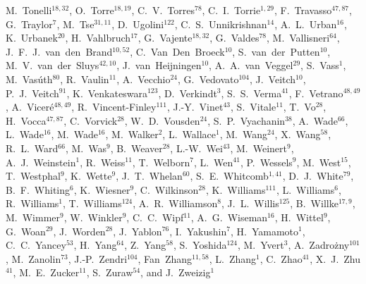 \documentclass[12pt]{iopart}
\begin{document}
{M.~Tonelli$^{18,32}$, 
O.~Torre$^{18,19}$, 
C.~V.~Torres$^{78}$, 
C.~I.~Torrie$^{1,29}$, 
F.~Travasso$^{47,87}$, 
G.~Traylor$^{7}$, 
M.~Tse$^{31,11}$, 
D.~Ugolini$^{122}$, 
C.~S.~Unnikrishnan$^{14}$, 
A.~L.~Urban$^{16}$, 
K.~Urbanek$^{20}$, 
H.~Vahlbruch$^{17}$, 
G.~Vajente$^{18,32}$, 
G.~Valdes$^{78}$, 
M.~Vallisneri$^{64}$, 
J.~F.~J.~van~den~Brand$^{10,52}$, 
C.~Van~Den~Broeck$^{10}$, 
S.~van~der~Putten$^{10}$, 
M.~V.~van~der~Sluys$^{42,10}$, 
J.~van~Heijningen$^{10}$, 
A.~A.~van~Veggel$^{29}$, 
S.~Vass$^{1}$, 
M.~Vas\'uth$^{80}$, 
R.~Vaulin$^{11}$, 
A.~Vecchio$^{24}$, 
G.~Vedovato$^{104}$, 
J.~Veitch$^{10}$, 
P.~J.~Veitch$^{91}$, 
K.~Venkateswara$^{123}$, 
D.~Verkindt$^{3}$, 
S.~S.~Verma$^{41}$, 
F.~Vetrano$^{48,49}$, 
A.~Vicer\'e$^{48,49}$, 
R.~Vincent-Finley$^{111}$, 
J.-Y.~Vinet$^{43}$, 
S.~Vitale$^{11}$, 
T.~Vo$^{28}$, 
H.~Vocca$^{47,87}$, 
C.~Vorvick$^{28}$, 
W.~D.~Vousden$^{24}$, 
S.~P.~Vyachanin$^{38}$, 
A.~Wade$^{66}$, 
L.~Wade$^{16}$, 
M.~Wade$^{16}$, 
M.~Walker$^{2}$, 
L.~Wallace$^{1}$, 
M.~Wang$^{24}$, 
X.~Wang$^{58}$, 
R.~L.~Ward$^{66}$, 
M.~Was$^{9}$, 
B.~Weaver$^{28}$, 
L.-W.~Wei$^{43}$, 
M.~Weinert$^{9}$, 
A.~J.~Weinstein$^{1}$, 
R.~Weiss$^{11}$, 
T.~Welborn$^{7}$, 
L.~Wen$^{41}$, 
P.~Wessels$^{9}$, 
M.~West$^{15}$, 
T.~Westphal$^{9}$, 
K.~Wette$^{9}$, 
J.~T.~Whelan$^{60}$, 
S.~E.~Whitcomb$^{1,41}$, 
D.~J.~White$^{79}$, 
B.~F.~Whiting$^{6}$, 
K.~Wiesner$^{9}$, 
C.~Wilkinson$^{28}$, 
K.~Williams$^{111}$, 
L.~Williams$^{6}$, 
R.~Williams$^{1}$, 
T.~Williams$^{124}$, 
A.~R.~Williamson$^{8}$, 
J.~L.~Willis$^{125}$, 
B.~Willke$^{17,9}$, 
M.~Wimmer$^{9}$, 
W.~Winkler$^{9}$, 
C.~C.~Wipf$^{11}$, 
A.~G.~Wiseman$^{16}$, 
H.~Wittel$^{9}$, 
G.~Woan$^{29}$, 
J.~Worden$^{28}$, 
J.~Yablon$^{76}$, 
I.~Yakushin$^{7}$, 
H.~Yamamoto$^{1}$, 
C.~C.~Yancey$^{53}$, 
H.~Yang$^{64}$, 
Z.~Yang$^{58}$, 
S.~Yoshida$^{124}$, 
M.~Yvert$^{3}$, 
A.~Zadro\.zny$^{101}$, 
M.~Zanolin$^{73}$, 
J.-P.~Zendri$^{104}$, 
Fan~Zhang$^{11,58}$, 
L.~Zhang$^{1}$, 
C.~Zhao$^{41}$, 
X.~J.~Zhu$^{41}$, 
M.~E.~Zucker$^{11}$, 
S.~Zuraw$^{54}$,
and 
J.~Zweizig$^{1}$}

\author{M.~Boyle$^{126}$,
B.~Br\"ugmann$^{127}$,
L.~T.~Buchman$^{64}$,
M.~Campanelli$^{60}$,
T.~Chu$^{57}$,
Z.~B.~Etienne$^{53,40}$,
M.~Hannam$^{8}$,
J.~Healy$^{128,60}$,
I.~Hinder$^{25}$,
L.~E.~Kidder$^{126}$,
P.~Laguna$^{128}$,
Y.~T.~Liu$^{129}$,
L.~London$^{128}$,
C.~O.~Lousto$^{60}$,
G.~Lovelace$^{22,126}$,
I.~MacDonald$^{57,130}$,
P.~Marronetti$^{131}$,
P.~M\"osta$^{25}$,
D.~M\"uller$^{127}$,
B.~C.~Mundim$^{60,25}$,
H.~Nakano$^{60,132}$,
V.~Paschalidis$^{129}$,
L.~Pekowsky$^{15,128}$,
D.~Pollney$^{55}$,
H.~P.~Pfeiffer$^{57,133}$,
M.~Ponce$^{60,134}$,
M.~P\"urrer$^{8}$,
G.~Reifenberger$^{131}$,
C.~Reisswig$^{64}$,
L.~Santamar\'ia$^{1}$,
M.~A.~Scheel$^{64}$,
S.~L.~Shapiro$^{129}$,
D.~Shoemaker$^{128}$,
C.~F.~Sopuerta$^{135}$,
U.~Sperhake$^{75,1,21}$,
B.~Szil{\'{a}}gyi$^{64}$,
N.~W.~Taylor$^{64}$,
W.~Tichy$^{131}$,
P.~Tsatsin$^{131}$,
and
Y.~Zlochower$^{60}$}
\end{document}
